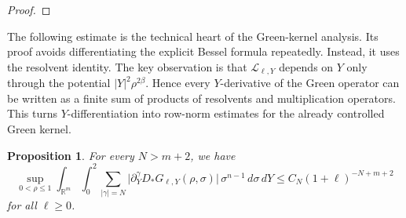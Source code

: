 \documentclass[12pt]{amsart}
\newtheorem{proposition}[theorem]{Proposition}
\begin{document}
\begin{proof}




\end{proof}







The following estimate is the technical heart of the Green-kernel analysis. Its
proof avoids differentiating the explicit Bessel formula repeatedly. Instead, it
uses the resolvent identity. The key observation is that $\mathcal L_{\ell,Y}$ depends on
$Y$ only through the potential $|Y|^2\rho^{2\beta}$. Hence every $Y$-derivative
of the Green operator can be written as a finite sum of products of resolvents and
multiplication operators. This turns $Y$-differentiation into row-norm estimates
for the already controlled Green kernel.









\begin{proposition}\label{lem:second_to_last}
For every $N> m+2$, we have
\begin{equation}
    \sup_{0<\rho\le 1} \int_{\mathbb{R}^m} \int_0^2 \sum_{|\gamma|=N} \bigl| \partial_Y^\gamma D_* G_{\ell,Y}(\rho,\sigma) \bigr| \, \sigma^{n-1} \, d\sigma \, dY \le C_{N} (1+\ell)^{-N+m+2}
\end{equation}
for all $\ell \ge 0$.
\end{proposition}
\end{document}
